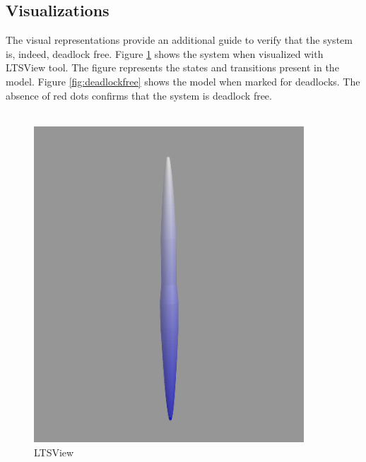 \documentclass[a4paper,12pt]{article}
\begin{document}
	\subsection{Visualizations}
	The visual representations provide an additional guide to verify that the system is, indeed, deadlock free. Figure \ref{fig:ltsview-1} shows the system when visualized with LTSView tool. The figure represents the states and transitions present in the model. Figure \ref{fig:deadlockfree} shows the model when marked for deadlocks. The absence of red dots confirms that the system is deadlock free.
	\\
	\\
	\begin{figure}[ht]
		\centering
		\begin{minipage}{0.45\textwidth}
			\centering
			\includegraphics[width=0.9\textwidth]{3D-Model.png} \caption{LTSView}
			\label{fig:ltsview-1}
		\end{minipage}\hfill
		\begin{minipage}{0.45\textwidth}
			\centering

\end{minipage}
\end{figure}
\end{document}
